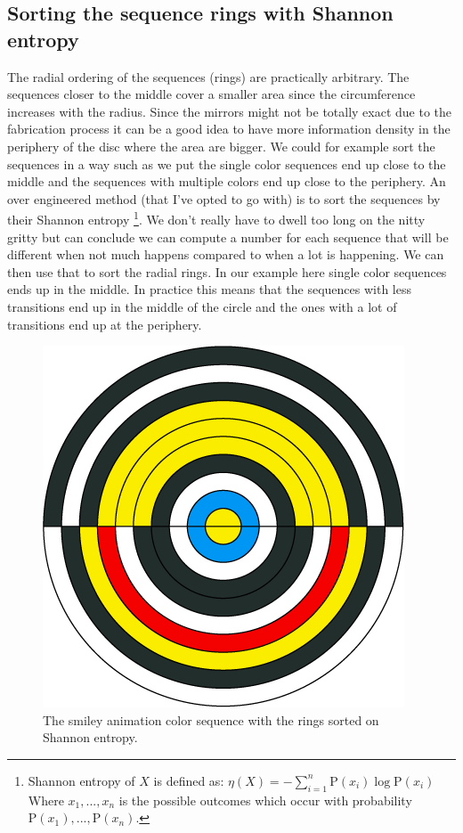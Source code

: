 \documentclass{article}
\begin{document}
\subsection{Sorting the sequence rings with Shannon entropy}

The radial ordering of the sequences (rings) are practically arbitrary.
The sequences closer to the middle cover a smaller area since the
circumference increases with the radius. Since the mirrors might not be
totally exact due to the fabrication process it can be a good idea to
have more information density in the periphery of the disc where the
area are bigger. We could for example sort the sequences in a way such
as we put the single color sequences end up close to the middle and the
sequences with multiple colors end up close to the periphery. An over
engineered method (that I've opted to go with) is to sort the sequences
by their Shannon entropy \footnote{Shannon entropy of \(X\) is defined as:
\(\eta(X) = -\sum_{i=1}^n {\mathrm{P}(x_i) \log \mathrm{P}(x_i)}\)\\
Where \(x_1, ..., x_n\) is the possible outcomes which occur with
probability \(\mathrm{P}(x_1), ..., \mathrm{P}(x_n)\).}.
We don't really have to dwell too long on the nitty gritty but can
conclude we can compute a number for each sequence that will be
different when not much happens compared to when a lot is happening. We
can then use that to sort the radial rings. In our example here single
color sequences ends up in the middle. In practice this means that the
sequences with less transitions end up in the middle of the circle and
the ones with a lot of transitions end up at the periphery.

\begin{figure}[ht!]
\centering
\includegraphics{images/sequence-wheel.png}
\caption{The smiley animation color sequence with the rings sorted on Shannon entropy.}
\end{figure}
\end{document}
